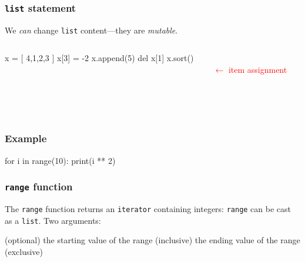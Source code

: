 \documentclass[11pt]{beamer}
\begin{document}
\begin{frame}[fragile]
  \frametitle{\texttt{list} statement}
  \Enlarge

  \begin{itemize}
  \myitem  We \emph{can} change \texttt{list} content---they are \emph{mutable}. \pause
  \end{itemize}
  \begin{columns}
  \begin{column}{0.6\textwidth}
    \begin{semiverbatim}
    x = [ 4,1,2,3 ]
    x[3] = -2
    x.append(5)
    del x[1]
    x.sort()
    \end{semiverbatim}
  \end{column}
  \begin{column}{0.4\textwidth}
  ~ \\
  \textcolor{red}{$\leftarrow$ item assignment}
  ~ \\ ~ \\ ~ \\ ~ \\
  \end{column}
  \end{columns}
\end{frame}

\begin{frame}[fragile]
  \frametitle{Example}
  \Enlarge

  \begin{semiverbatim}
for i in range(10):
    print(i ** 2)
  \end{semiverbatim}
\end{frame}

\begin{frame}[fragile]
  \frametitle{\texttt{range} function}
  \Enlarge

  \begin{itemize}
  \myitem  The \texttt{range} function returns an \texttt{iterator} containing integers: \pause
  \myitem  \texttt{range} can be cast as a \texttt{list}. \pause
  \myitem  Two arguments:
    \begin{itemize}
    \mysubitem  (optional) the starting value of the range (inclusive)
    \mysubitem  the ending value of the range (exclusive)
    \end{itemize}
  \end{itemize}
\end{frame}
\end{document}
